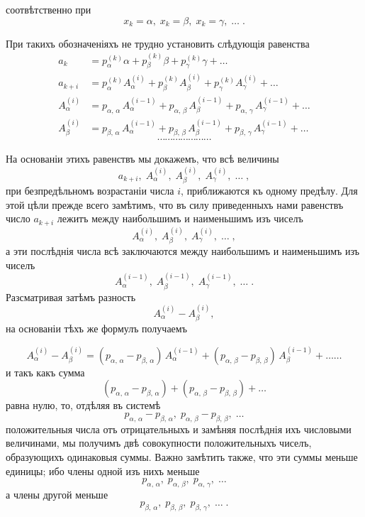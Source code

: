 \documentclass[12pt]{article}
\begin{document}

соотвѣтственно при
\[
x_k = \alpha,\; x_k = \beta,\; x_k = \gamma,\;\ldots\;.
\]

При такихъ обозначеніяхъ не трудно установить слѣду\-ющія равенства
\begin{align*}
a_k &= p_{\alpha}^{(k)} \alpha + p_{\beta}^{(k)} \beta + p_{\gamma}^{(k)} \gamma + \ldots \\[4pt]
a_{k+i} &= p_{\alpha}^{(k)} A_{\alpha}^{(i)} + p_{\beta}^{(k)} A_{\beta}^{(i)} + p_{\gamma}^{(k)} A_{\gamma}^{(i)} + \ldots \\[4pt]
A_{\alpha}^{(i)} &= p_{\alpha,\,\alpha}\, A_{\alpha}^{(i-1)} + p_{\alpha,\,\beta}\, A_{\beta}^{(i-1)} + p_{\alpha,\,\gamma}\, A_{\gamma}^{(i-1)} + \ldots \\[4pt]
A_{\beta}^{(i)} &= p_{\beta,\,\alpha}\, A_{\alpha}^{(i-1)} + p_{\beta,\,\beta}\, A_{\beta}^{(i-1)} + p_{\beta,\,\gamma}\, A_{\gamma}^{(i-1)} + \ldots
\end{align*}
\[
\cdots\cdots\cdots\cdots\cdots\cdots\cdots
\]

На основаніи этихъ равенствъ мы докажемъ, что всѣ величины
\[
a_{k+i},\; A_{\alpha}^{(i)},\; A_{\beta}^{(i)},\; A_{\gamma}^{(i)},\;\ldots\;,
\]
при безпредѣльномъ возрастаніи числа $i$, приближаются къ
одному предѣлу. Для этой цѣли прежде всего замѣтимъ, что
въ силу приведенныхъ нами равенствъ число $a_{k+i}$ лежитъ ме\-жду наибольшимъ и наименьшимъ изъ чиселъ
\[
A_{\alpha}^{(i)},\; A_{\beta}^{(i)},\; A_{\gamma}^{(i)},\;\ldots\;,
\]
а эти послѣднія числа всѣ заключаются между наибольшимъ
и наименьшимъ изъ чиселъ
\[
A_{\alpha}^{(i-1)},\; A_{\beta}^{(i-1)},\; A_{\gamma}^{(i-1)},\;\ldots\;.
\]
Разсматривая затѣмъ разность
\[
A_{\alpha}^{(i)} - A_{\beta}^{(i)},
\]
на основаніи тѣхъ же формулъ получаемъ


\[
A_{\alpha}^{(i)} - A_{\beta}^{(i)} = (p_{\alpha,\,\alpha} - p_{\beta,\,\alpha})\, A_{\alpha}^{(i-1)} + (p_{\alpha,\,\beta} - p_{\beta,\,\beta})\, A_{\beta}^{(i-1)} + \ldots\ldots
\]
и такъ какъ сумма
\[
(p_{\alpha,\,\alpha} - p_{\beta,\,\alpha}) + (p_{\alpha,\,\beta} - p_{\beta,\,\beta}) + \ldots
\]
равна нулю, то, отдѣляя въ системѣ
\[
p_{\alpha,\,\alpha} - p_{\beta,\,\alpha},\; p_{\alpha,\,\beta} - p_{\beta,\,\beta},\;\ldots
\]
положительныя числа отъ отрицательныхъ и замѣняя послѣд\-нія ихъ числовыми величинами, мы получимъ двѣ совокупно\-сти положительныхъ чиселъ, образующихъ одинаковыя суммы.
Важно замѣтить также, что эти суммы меньше едини\-цы; ибо члены одной изъ нихъ меньше
\[
p_{\alpha,\,\alpha},\; p_{\alpha,\,\beta},\; p_{\alpha,\,\gamma},\;\ldots
\]
а члены другой меньше
\[
p_{\beta,\,\alpha},\; p_{\beta,\,\beta},\; p_{\beta,\,\gamma},\;\ldots\;.
\]
\end{document}
